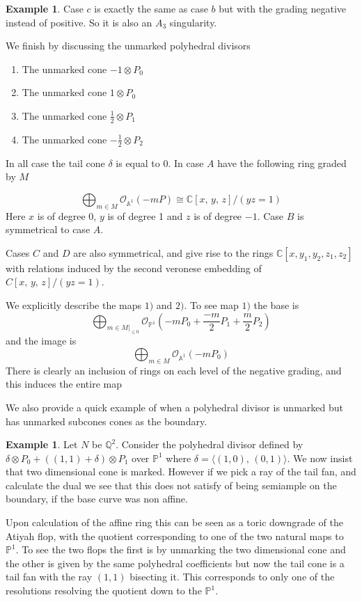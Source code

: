 \documentclass[12pt,a4paper]{book}      %
\theoremstyle{definition}
\newtheorem{ex}[thm]{Example}
\newcommand{\mb}[1]{\mathbb{#1}}
\begin{document}
\begin{ex}
Case $c$ is exactly the same as case $b$ but with the grading negative instead of positive. So it is also an $A_3$ singularity.


We finish by discussing the unmarked polyhedral divisors

\begin{enumerate}[label =\Alph*)]
\item The unmarked cone $-1 \otimes P_0$
\item The unmarked cone $1 \otimes P_0$
\item The unmarked cone $\frac{1}{2} \otimes P_1$
\item The unmarked cone $-\frac{1}{2} \otimes P_2$
\end{enumerate}

In all case the tail cone $\delta$ is equal to 0. In case $A$ have the following ring graded by $M$

\[
\bigoplus_{m \in M} \mathcal{O}_{\mathbb{A}^1}(-mP) \cong \mathbb{C}[x,\, y, \, z]/(yz = 1)
\]
Here $x$ is of degree 0, $y$ is of degree 1 and $z$ is of degree $-1$. Case $B$ is symmetrical to case $A$. 

Cases $C$ and $D$ are also symmetrical, and give rise to the rings $\mathbb{C}[x, y_1, y_2, z_1, z_2]$ with relations induced by the second veronese embedding of $C[x, \, y, \, z]/(yz = 1)$. 


We explicitly describe the maps $1)$ and $2)$. To see map $1)$ the base is 
\[
\bigoplus_{m \in M|_{\leq 0}} \mathcal{O}_{\mathbb{P}^1} \left(-mP_0 +\frac{-m}{2} P_1 + \frac{m}{2}P_2 \right) 
\]
and the image is 
\[
\bigoplus_{m \in M} \mathcal{O}_{\mathbb{A}^1}(-mP_0)
\]
There is clearly an inclusion of rings on each level of the negative grading, and this induces the entire map
\end{ex}

We also provide a quick example of when a polyhedral divisor is unmarked but has unmarked subcones cones as the boundary. 

\begin{ex}\rm
Let $N$ be $\mb{Q}^2$. Consider the polyhedral divisor defined by $\delta \otimes P_0 + ((1, 1) + \delta) \otimes P_1$ over $\mathbb{P}^1$ where $\delta = \langle (1,0) , \, (0, 1) \rangle$. We now insist that two dimensional cone is marked. However if we pick a ray of the tail fan, and calculate the dual we see that this does not satisfy of being semiample on the boundary, if the base curve was non affine.

Upon calculation of the affine ring this can be seen as a toric downgrade of the Atiyah flop, with the quotient corresponding to one of the two natural maps to $\mathbb{P}^1$. To see the two flops the first is by unmarking the two dimensional cone and the other is given by the same polyhedral coefficients but now the tail cone is a tail fan with the ray $(1,1)$ bisecting it. This corresponds to only one of the resolutions resolving the quotient down to the $\mathbb{P}^1$.
\end{ex}
\end{document}
